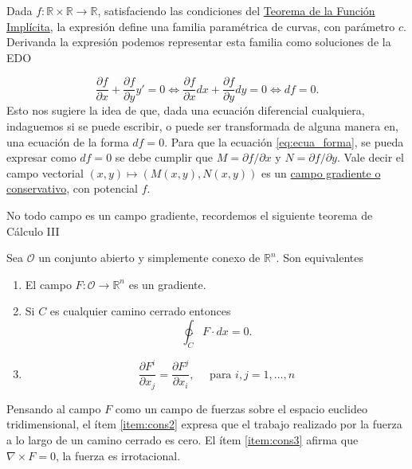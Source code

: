 \documentclass{article}
\newcommand{\rr}{\mathbb{R}}
\begin{document}
 Dada $f:\rr\times\rr\to\rr$, satisfaciendo las condiciones del \href{https://es.wikipedia.org/wiki/Teorema_de_la_funci%C3%B3n_impl%C3%ADcita}{Teorema de la Función Implícita}, la expresión
define una  familia paramétrica de curvas, con parámetro $c$. Derivanda la expresión podemos representar esta familia como soluciones de la EDO

\[
 \frac{\partial f}{\partial x}+\frac{\partial f}{\partial y}y'=0\Longleftrightarrow \frac{\partial f}{\partial x}dx+\frac{\partial f}{\partial y}dy=0
 \Longleftrightarrow df=0.
\]
 Esto nos sugiere la idea de que, dada una ecuación diferencial cualquiera, indaguemos si se puede escribir, o puede ser transformada de alguna manera en, una ecuación de la forma $df=0$.  Para que la ecuación \eqref{eq:ecua_forma}, se pueda expresar como $df=0$ se debe cumplir que  $M=\partial f/\partial x$ y $N=\partial f/\partial y$.
 Vale decir el campo vectorial $(x,y)\mapsto (M(x,y),N(x,y))$ es un \href{http://es.wikipedia.org/wiki/Fuerza_conservativa}{campo 
gradiente o conservativo}, con potencial $f$.

No todo campo es un campo gradiente, recordemos el siguiente teorema de Cálculo III

 \begin{teorema}\label{teo:campo_cons} Sea $\mathcal{O}$ un conjunto abierto y simplemente conexo de $\rr^n$. Son equivalentes
 \begin{enumerate}
  \item\label{item:cons1} El campo $F:\mathcal{O}\to\rr^n$ es un gradiente.
  \item\label{item:cons2} Si $C$ es cualquier camino cerrado entonces
  \[\ointctrclockwise_C F\cdot d x=0.\]
  \item\label{item:cons3} \[\frac{\partial F^i}{\partial x_j}=\frac{\partial F^j}{\partial x_i},\quad\text{ para }i,j=1,\ldots,n\]
 \end{enumerate}

\end{teorema}

Pensando al campo $F$ como un campo de  fuerzas sobre el espacio euclideo tridimensional,  el ítem \ref{item:cons2} expresa que el trabajo realizado por la fuerza a lo largo de un camino cerrado es cero. El ítem \ref{item:cons3} afirma que $\nabla\times F=0$, la fuerza es irrotacional.
\end{document}
